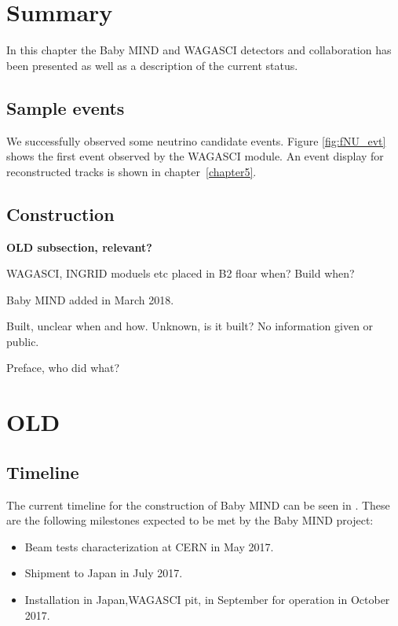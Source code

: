 \section{Summary}
In this chapter the Baby MIND and WAGASCI detectors and collaboration has been presented as well as a description of the current status.

\subsection{Sample events}

We successfully observed some neutrino candidate events. Figure \ref{fig:fNU_evt} shows the first event observed by the WAGASCI module. An event display for reconstructed tracks is shown in chapter~\ref{chapter5}.


\subsection{Construction}

\textbf{OLD subsection, relevant?}

WAGASCI, INGRID moduels etc placed in B2 floar when? Build when?

Baby MIND added in March 2018.

Built, unclear when and how.
Unknown, is it built? No information given or public.

Preface, who did what?


\fi

\section{OLD}
\subsection{Timeline}
The current timeline for the construction of Baby MIND can be seen in .
These are the following milestones expected to be met by the Baby MIND project:
\begin{itemize}
\item Beam tests characterization at CERN in May 2017.
\item Shipment to Japan in July 2017.
\item Installation in Japan,WAGASCI pit, in September for operation in October 2017.
\end{itemize}

